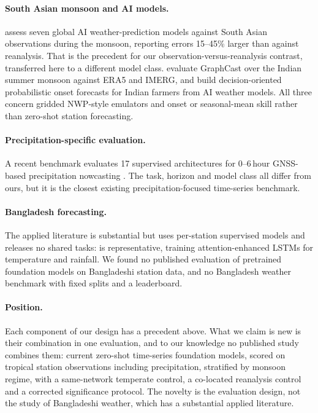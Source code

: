 \paragraph{South Asian monsoon and AI models.} \citet{gupta2026mausam} assess seven global AI weather-prediction
models against South Asian observations during the monsoon, reporting errors 15--45\% larger than against
reanalysis. That is the precedent for our observation-versus-reanalysis contrast, transferred here to a different
model class. \citet{luitel2026ism} evaluate GraphCast over the Indian summer monsoon against ERA5 and IMERG, and
\citet{aitken2026monsoon} build decision-oriented probabilistic onset forecasts for Indian farmers from AI weather
models. All three concern gridded NWP-style emulators and onset or seasonal-mean skill rather than zero-shot
station forecasting.

\paragraph{Precipitation-specific evaluation.} A recent benchmark evaluates 17 supervised architectures for 0--6\,hour
GNSS-based precipitation nowcasting \citep{zhang2025rainfallbench}. The task, horizon and model class all differ from
ours, but it is the closest existing precipitation-focused time-series benchmark.

\paragraph{Bangladesh forecasting.} The applied literature is substantial but uses per-station supervised models
and releases no shared tasks: \citet{joy2026bangladesh} is representative, training attention-enhanced LSTMs for
temperature and rainfall. We found no published evaluation of pretrained foundation models on Bangladeshi
station data, and no Bangladesh weather benchmark with fixed splits and a leaderboard.

\paragraph{Position.} Each component of our design has a precedent above. What we claim is new is their
combination in one evaluation, and to our knowledge no published study combines them: current zero-shot
time-series foundation models, scored on tropical station observations including precipitation, stratified by
monsoon regime, with a same-network temperate control, a co-located reanalysis control and a corrected
significance protocol. The novelty is the evaluation design, not the study of Bangladeshi weather, which has a
substantial applied literature.
